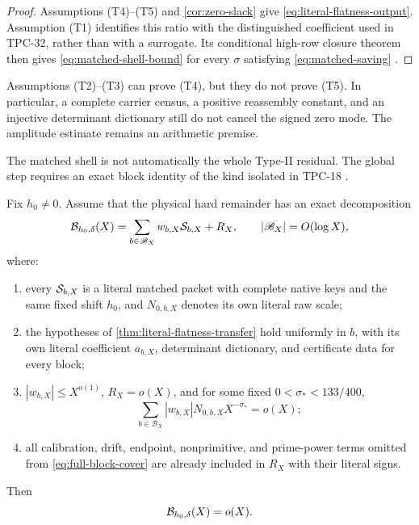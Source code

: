\begin{proof}
Assumptions (T4)--(T5) and
\cref{cor:zero-slack} give
\eqref{eq:literal-flatness-output}.  Assumption (T1) identifies this
ratio with the distinguished coefficient used in TPC-32, rather than
with a surrogate.  Its conditional high-row closure theorem then
gives \eqref{eq:matched-shell-bound} for every
\(\sigma\) satisfying \eqref{eq:matched-saving}
\citep{WangTPC32}.
\end{proof}

\begin{remark}
Assumptions (T2)--(T3) can prove (T4), but they do not prove (T5).
In particular, a complete carrier census, a positive reassembly
constant, and an injective determinant dictionary still do not
cancel the signed zero mode.  The amplitude estimate remains an
arithmetic premise.
\end{remark}

The matched shell is not automatically the whole Type-II residual.
The global step requires an exact block identity of the kind isolated
in TPC-18 \citep{WangTPC18}.

\begin{theorem}
\label{thm:full-block-transfer}
Fix \(h_0\ne0\).  Assume that the physical hard remainder has an exact
decomposition
\begin{equation}
 \mathcal B_{h_0,\delta}(X)
 =
 \sum_{b\in\mathscr B_X}w_{b,X}\mathcal S_{b,X}
 +R_X,
 \qquad
 |\mathscr B_X|=O(\log X),
 \label{eq:full-block-cover}
\end{equation}
where:
\begin{enumerate}[label=(F\arabic*),leftmargin=2.7em]
\item every \(\mathcal S_{b,X}\) is a literal matched packet with complete
native keys and the same fixed shift \(h_0\), and
\(N_{0,b,X}\) denotes its own literal raw scale;
\item the hypotheses of
\cref{thm:literal-flatness-transfer} hold uniformly in \(b\), with
its own literal coefficient \(a_{b,X}\), determinant dictionary, and
certificate data for every block;
\item \(|w_{b,X}|\le X^{o(1)}\), \(R_X=o(X)\), and for some fixed
\(0<\sigma_*<133/400\),
\begin{equation}
 \sum_{b\in\mathscr B_X}
 |w_{b,X}|N_{0,b,X}X^{-\sigma_*}=o(X);
 \label{eq:block-normalization-close}
\end{equation}
\item all calibration, drift, endpoint, nonprimitive, and prime-power
terms omitted from \eqref{eq:full-block-cover} are already included in
\(R_X\) with their literal signs.
\end{enumerate}
Then
\begin{equation}
 \mathcal B_{h_0,\delta}(X)=o(X).
 \label{eq:hard-remainder-small}
\end{equation}
\end{theorem}

